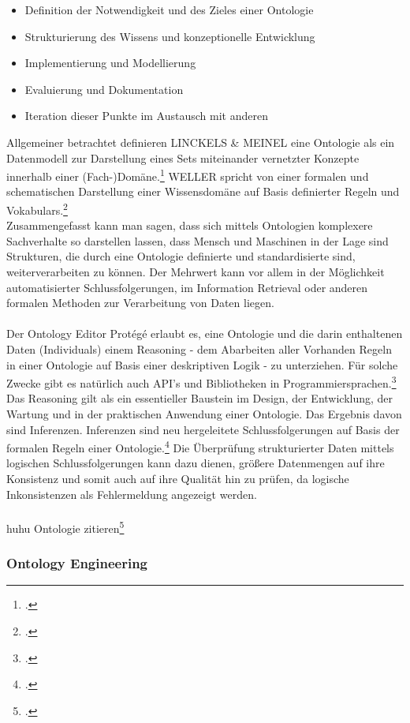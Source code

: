 \documentclass[12pt,a4paper]{article}
\begin{document}
\begin{itemize}
\item Definition der Notwendigkeit und des Zieles einer Ontologie
\item Strukturierung des Wissens und konzeptionelle Entwicklung
\item Implementierung und Modellierung
\item Evaluierung und Dokumentation
\item Iteration dieser Punkte im Austausch mit anderen
\end{itemize}
Allgemeiner betrachtet definieren LINCKELS \& MEINEL eine Ontologie als ein Datenmodell zur Darstellung eines Sets miteinander vernetzter Konzepte innerhalb einer (Fach-)Domäne.\footcite{linckels2011librarian}
WELLER spricht von einer formalen und schematischen Darstellung einer Wissensdomäne auf Basis definierter Regeln und Vokabulars.\footcite{weller2013InformationBand}
\\ 
Zusammengefasst kann man sagen, dass sich mittels Ontologien komplexere Sachverhalte so darstellen lassen, dass Mensch und Maschinen in der Lage sind Strukturen, die durch eine Ontologie definierte und standardisierte sind, weiterverarbeiten zu können. Der Mehrwert kann vor allem in der Möglichkeit automatisierter Schlussfolgerungen, im Information Retrieval oder anderen formalen Methoden zur Verarbeitung von Daten liegen.
\\
\\
Der Ontology Editor Protégé erlaubt es, eine Ontologie und die darin enthaltenen Daten (Individuals) einem Reasoning - dem Abarbeiten aller Vorhanden Regeln in einer Ontologie auf Basis einer deskriptiven Logik - zu unterziehen. Für solche Zwecke gibt es natürlich auch API's und Bibliotheken in Programmiersprachen.\footcite{musen2015protege} Das Reasoning gilt als ein essentieller Baustein im Design, der Entwicklung, der Wartung und in der praktischen Anwendung einer Ontologie. Das Ergebnis davon sind Inferenzen. Inferenzen sind neu hergeleitete Schlussfolgerungen auf Basis der formalen Regeln einer Ontologie.\footcite{dentler2011comparison} Die Überprüfung strukturierter Daten mittels logischen Schlussfolgerungen kann dazu dienen, größere Datenmengen auf ihre Konsistenz und somit auch auf ihre Qualität hin zu prüfen, da logische Inkonsistenzen als Fehlermeldung angezeigt werden.
\\
\\
huhu Ontologie zitieren\footcite[Vgl][S.162-178]{jannidis2017digital} 

\subsubsection{Ontology Engineering}
\end{document}

